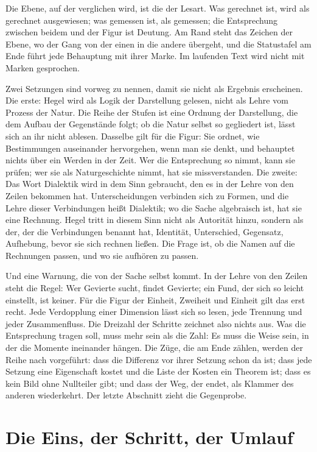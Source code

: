\documentclass[11pt,a4paper]{article}
\begin{document}
Die Ebene, auf der verglichen wird, ist die der Lesart. Was gerechnet ist, wird als gerechnet ausgewiesen; was gemessen ist, als gemessen; die Entsprechung zwischen beidem und der Figur ist Deutung. Am Rand steht das Zeichen der Ebene, wo der Gang von der einen in die andere übergeht, und die Statustafel am Ende führt jede Behauptung mit ihrer Marke. Im laufenden Text wird nicht mit Marken gesprochen.

Zwei Setzungen sind vorweg zu nennen, damit sie nicht als Ergebnis erscheinen. Die erste: Hegel wird als Logik der Darstellung gelesen, nicht als Lehre vom Prozess der Natur. Die Reihe der Stufen ist eine Ordnung der Darstellung, die dem Aufbau der Gegenstände folgt; ob die Natur selbst so gegliedert ist, lässt sich an ihr nicht ablesen. Dasselbe gilt für die Figur: Sie ordnet, wie Bestimmungen auseinander hervorgehen, wenn man sie denkt, und behauptet nichts über ein Werden in der Zeit. Wer die Entsprechung so nimmt, kann sie prüfen; wer sie als Naturgeschichte nimmt, hat sie missverstanden. Die zweite: Das Wort Dialektik wird in dem Sinn gebraucht, den es in der Lehre von den Zeilen bekommen hat. Unterscheidungen verbinden sich zu Formen, und die Lehre dieser Verbindungen heißt Dialektik; wo die Sache algebraisch ist, hat sie eine Rechnung. Hegel tritt in diesem Sinn nicht als Autorität hinzu, sondern als der, der die Verbindungen benannt hat, Identität, Unterschied, Gegensatz, Aufhebung, bevor sie sich rechnen ließen. Die Frage ist, ob die Namen auf die Rechnungen passen, und wo sie aufhören zu passen.

Und eine Warnung, die von der Sache selbst kommt. In der Lehre von den Zeilen steht die Regel: Wer Gevierte sucht, findet Gevierte; ein Fund, der sich so leicht einstellt, ist keiner. Für die Figur der Einheit, Zweiheit und Einheit gilt das erst recht. Jede Verdopplung einer Dimension lässt sich so lesen, jede Trennung und jeder Zusammenfluss. Die Dreizahl der Schritte zeichnet also nichts aus. Was die Entsprechung tragen soll, muss mehr sein als die Zahl: Es muss die Weise sein, in der die Momente ineinander hängen. Die Züge, die am Ende zählen, werden der Reihe nach vorgeführt: dass die Differenz vor ihrer Setzung schon da ist; dass jede Setzung eine Eigenschaft kostet und die Liste der Kosten ein Theorem ist; dass es kein Bild ohne Nullteiler gibt; und dass der Weg, der endet, als Klammer des anderen wiederkehrt. Der letzte Abschnitt zieht die Gegenprobe.

\section{Die Eins, der Schritt, der Umlauf}
\label{sec:eins}
\end{document}
